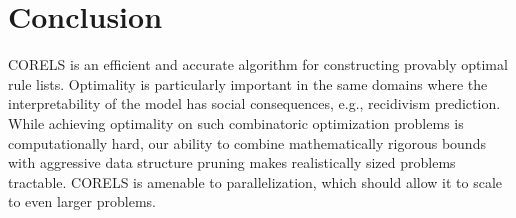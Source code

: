 \section{Conclusion}

CORELS is an efficient and accurate algorithm for constructing provably
optimal rule lists.
Optimality is particularly important in the same domains where the
interpretability of the model has social consequences, e.g., recidivism
prediction.
While achieving optimality on such combinatoric optimization problems is
computationally hard, our ability to combine mathematically rigorous bounds
with aggressive data structure pruning makes realistically sized problems
tractable.
CORELS is amenable to parallelization, which should allow it to scale to
even larger problems.

